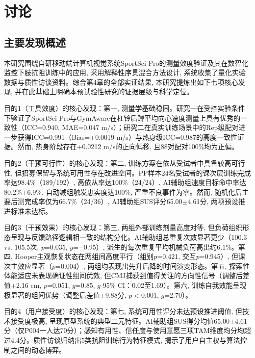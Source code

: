 
\chapter{讨论}

\section{主要发现概述}
\label{sec:ch5_intro}

本研究围绕自研移动端计算机视觉系统SportSci Pro的测量效度验证及其在数智化监控下肢抗阻训练中的应用, 采用解释性序贯混合方法设计, 系统收集了量化实验数据与质性访谈资料。综合第4章的全部实证结果, 本研究提炼出如下七项核心发现, 并在此基础上明确本预试验性研究的证据层级与科学定位。

目的1（工具效度）的核心发现：第一, 测量学基础稳固。研究一在受控实验条件下验证了SportSci Pro与GymAware在杠铃后蹲平均向心速度测量上具有优秀的一致性（ICC=0.940, MAE=0.047 m/s）；研究二在真实训练场景中的Rep级配对进一步获得ICC=0.991（Bias=+0.0019 m/s）与热身级ICC=0.987的高度一致性证据。然而, 热身阶段存在+0.0212 m/s的正向偏移, 且88对配对100\%均为正偏。

目的2（干预可行性）的核心发现：第二, 训练方案在依从受试者中具备较高可行性, 但招募保留与系统可用性存在改进空间。PP样本24名受试者的课次层训练完成率达98.4\%（189/192）, 高依从率达100\%（24/24）, AI辅助组速度目标命中率达80.2\%$\pm$6.9\%, 自动减组触发忠实度达100\%, 严重不良事件为零。然而, 随机化后主要后测完成率仅为66.7\%（24/36）, AI辅助组SUS评分65.00$\pm$4.61分, 两项预设推进标准未达标。

目的3（干预效果）的核心发现：第三, 两组外部训练剂量高度对等, 但负荷组织形态呈现与反馈路径逻辑相一致的结构分化。AI辅助组总重复次数显著更少（100.3 vs. 105.5次, $p$=0.035, $g$=$-$0.95）, 派生的每次重复平均机械负荷高出约6.1\%。第四, Hooper主观恢复状态在两组间高度平行（组别$p$=0.421, 交互$p$=0.945）, 但课次主效应显著（$p$=0.004）, 两组均表现出先升后降的时间演变形态。第五, 探索性体能适应未表现确证性组间优效, 但CMJ捕获到值得关注的方向性信号（调整后差值+2.16 cm, $p$=0.051, $g$=0.85, $g$ 95\% CI：0.02至1.69）。第六, 训练自我效能呈现极显著的组间优势（调整后差值+9.88分, $p<0.001$, $g$=2.70）。

目的4（用户接受度）的核心发现：第七, 系统可用性评分未达预设推进阈值, 但技术接受度极高, 呈现原型系统的典型二元特征。AI辅助组SUS得分均值65.00$\pm$4.61分（仅P004一人达70分）；感知有用性、信任度与使用意愿三项TAM维度均分均超过4.4分。质性访谈归纳出5类抗阻训练行为特征模式, 揭示了用户自主权与算法控制之间的动态博弈。


